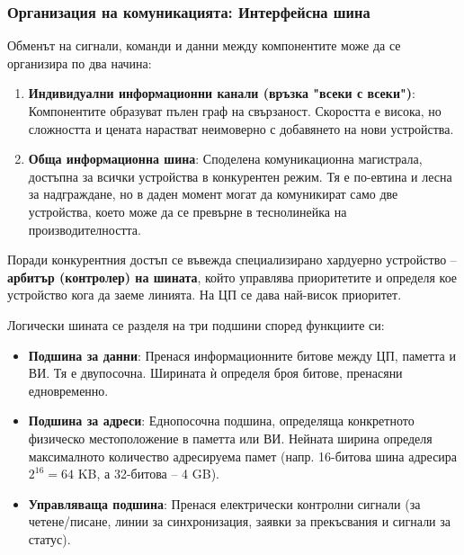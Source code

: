 \documentclass{scrartcl}
\begin{document}
\begin{FlushLeft}
\subsubsection{Организация на комуникацията: Интерфейсна шина} 
Обменът на сигнали, команди и данни между компонентите може да се организира по два начина:
\begin{enumerate}
    \item \textbf{Индивидуални информационни канали (връзка "всеки с всеки")}: Компонентите образуват пълен граф на свързаност. Скоростта е висока, но сложността и цената нарастват неимоверно с добавянето на нови устройства.
    \item \textbf{Обща информационна шина}: Споделена комуникационна магистрала, достъпна за всички устройства в конкурентен режим. Тя е по-евтина и лесна за надграждане, но в даден момент могат да комуникират само две устройства, което може да се превърне в теснолинейка на производителността.
\end{enumerate}

Поради конкурентния достъп се въвежда специализирано хардуерно устройство – \textbf{арбитър (контролер) на шината}, който управлява приоритетите и определя кое устройство кога да заеме линията. На ЦП се дава най-висок приоритет. 

Логически шината се разделя на три подшини според функциите си:
\begin{itemize}
    \item \textbf{Подшина за данни}: Пренася информационните битове между ЦП, паметта и ВИ. Тя е двупосочна. Ширината ѝ определя броя битове, пренасяни едновременно.
    \item \textbf{Подшина за адреси}: Еднопосочна подшина, определяща конкретното физическо местоположение в паметта или ВИ. Нейната ширина определя максималното количество адресируема памет (напр. 16-битова шина адресира $2^{16} = 64$ KB, а 32-битова – 4 GB).
    \item \textbf{Управляваща подшина}: Пренася електрически контролни сигнали (за четене/писане, линии за синхронизация, заявки за прекъсвания и сигнали за статус).
\end{itemize}


\end{FlushLeft}
\end{document}
